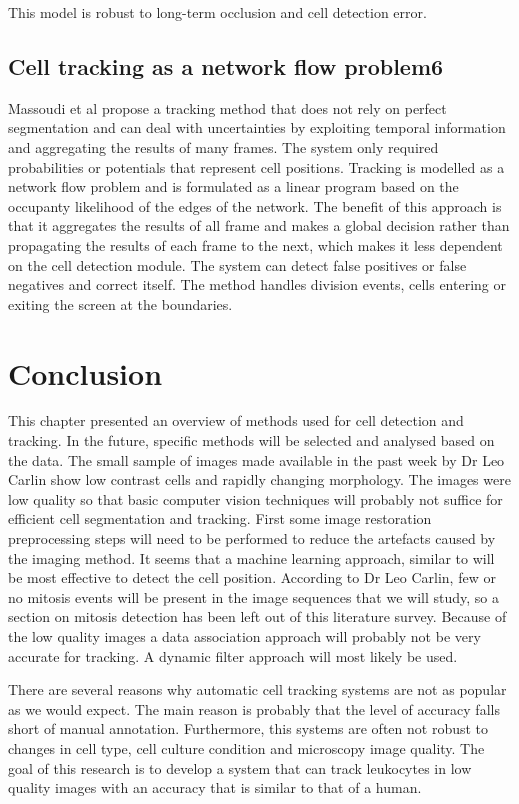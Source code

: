 \documentclass[12pt,a4paper,openany]{book}
\begin{document}
This model is robust to long-term occlusion and cell detection error.

\subsection{Cell tracking as a network flow problem6}

Massoudi et al \cite{massoudi12} propose a tracking method that does not rely on perfect segmentation and can deal with uncertainties by exploiting temporal information and aggregating the results of many frames. The system only required probabilities or potentials that represent cell positions. Tracking is modelled as a network flow problem and is formulated as a linear program based on the occupanty likelihood of the edges of the network. The benefit of this approach is that it aggregates the results of all frame and makes a global decision rather than propagating the results of each frame to the next, which makes it less dependent on the cell detection module. The system can detect false positives or false negatives and correct itself. The method handles division events, cells entering or exiting the screen at the boundaries.

\section{Conclusion}
\label{sec:conclusionmethods}
This chapter presented an overview of methods used for cell detection and tracking. In the future, specific methods will be selected and analysed based on the data. The small sample of images made available in the past week by Dr Leo Carlin show low contrast cells and rapidly changing morphology. The images were low quality so that basic computer vision techniques will probably not suffice for efficient cell segmentation and tracking. First some image restoration preprocessing steps will need to be performed to reduce the artefacts caused by the imaging method. It seems that a machine learning approach, similar to \cite{arteta13} will be most effective to detect the cell position. According to Dr Leo Carlin, few or no mitosis events will be present in the image sequences that we will study, so a section on mitosis detection has been left out of this literature survey. Because of the low quality images a data association approach will probably not be very accurate for tracking. A dynamic filter approach will most likely be used.

There are several reasons why automatic cell tracking systems are not as popular as we would expect. The main reason is probably that the level of accuracy falls short of manual annotation. Furthermore, this systems are often not robust to changes in cell type, cell culture condition and microscopy image quality. The goal of this research is to develop a system that can track leukocytes in low quality images with an accuracy that is similar to that of a human. 
\end{document}
